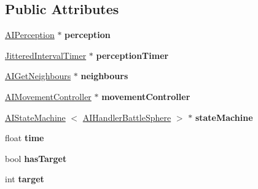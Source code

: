 \subsection*{\-Public \-Attributes}
\begin{DoxyCompactItemize}
\item 
\hypertarget{classAIHandlerBattleSphere_a9325ac04b62b567e2e3f25681a36eafd}{
\hyperlink{classAIPerception}{\-A\-I\-Perception} $\ast$ {\bfseries perception}}
\label{dc/dfb/classAIHandlerBattleSphere_a9325ac04b62b567e2e3f25681a36eafd}

\item 
\hypertarget{classAIHandlerBattleSphere_a2d171705ad0097513982dcbbc3d35f4a}{
\hyperlink{classJitteredIntervalTimer}{\-Jittered\-Interval\-Timer} $\ast$ {\bfseries perception\-Timer}}
\label{dc/dfb/classAIHandlerBattleSphere_a2d171705ad0097513982dcbbc3d35f4a}

\item 
\hypertarget{classAIHandlerBattleSphere_ac8ebeef442080f540bf3d694e34c1cdd}{
\hyperlink{classAIGetNeighbours}{\-A\-I\-Get\-Neighbours} $\ast$ {\bfseries neighbours}}
\label{dc/dfb/classAIHandlerBattleSphere_ac8ebeef442080f540bf3d694e34c1cdd}

\item 
\hypertarget{classAIHandlerBattleSphere_a486c5cfd21d455a3a85acab2181f843b}{
\hyperlink{classAIMovementController}{\-A\-I\-Movement\-Controller} $\ast$ {\bfseries movement\-Controller}}
\label{dc/dfb/classAIHandlerBattleSphere_a486c5cfd21d455a3a85acab2181f843b}

\item 
\hypertarget{classAIHandlerBattleSphere_af9c5f65d1e88d2e13b7adb7321554d4c}{
\hyperlink{classAIStateMachine}{\-A\-I\-State\-Machine}\*
$<$ \hyperlink{classAIHandlerBattleSphere}{\-A\-I\-Handler\-Battle\-Sphere} $>$ $\ast$ {\bfseries state\-Machine}}
\label{dc/dfb/classAIHandlerBattleSphere_af9c5f65d1e88d2e13b7adb7321554d4c}

\item 
\hypertarget{classAIHandlerBattleSphere_a2068d9968819b1ac4a43e7a156535e51}{
float {\bfseries time}}
\label{dc/dfb/classAIHandlerBattleSphere_a2068d9968819b1ac4a43e7a156535e51}

\item 
\hypertarget{classAIHandlerBattleSphere_a65306b0ea46211560ee315af32ce17f1}{
bool {\bfseries has\-Target}}
\label{dc/dfb/classAIHandlerBattleSphere_a65306b0ea46211560ee315af32ce17f1}

\item 
\hypertarget{classAIHandlerBattleSphere_a088021f8f5bb053e1af68f0e942f9b87}{
int {\bfseries target}}
\label{dc/dfb/classAIHandlerBattleSphere_a088021f8f5bb053e1af68f0e942f9b87}


\end{DoxyCompactItemize}
